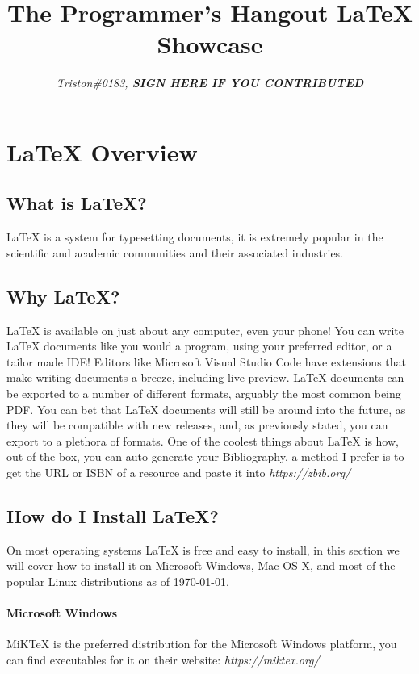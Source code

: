 \documentclass[]{report}
\title{The Programmer's Hangout \LaTeX{} Showcase}
\author{\textit{Triston\#0183, \textbf{SIGN HERE IF YOU CONTRIBUTED}}}
\begin{document}
\maketitle

\tableofcontents
\chapter{\LaTeX{} Overview}
\section{What is \LaTeX{}?}
	\LaTeX{} is a system for typesetting documents, it is extremely popular in the scientific and academic communities and their associated industries.
\section{Why \LaTeX{}?} 
	\LaTeX{} is available on just about any computer, even your phone!
	You can write \LaTeX{} documents like you would a program, using your preferred editor, or a tailor made IDE!
	Editors like Microsoft\texttrademark{} Visual Studio Code have extensions that make writing documents a breeze, including live preview.
	\LaTeX{} documents can be exported to a number of different formats, arguably the most common being PDF.
	You can bet that \LaTeX{} documents will still be around into the future, as they will be compatible with new releases, and, as previously stated, you can export to a plethora of formats.
	One of the coolest things about \LaTeX{} is how, out of the box, you can auto-generate your Bibliography, a method I prefer is to get the URL or ISBN of a resource and paste it into \textit{https://zbib.org/}
\section{How do I Install \LaTeX{}?}
	On most operating systems \LaTeX{} is free and easy to install, in this section we will cover how to install it on Microsoft\texttrademark{} Windows, Mac OS X, and most of the popular Linux distributions as of \today{}.
	\subsubsection{Microsoft\texttrademark{} Windows}
	    MiKTeX is the preferred distribution for the Microsoft\texttrademark{} Windows platform, you can find executables for it on their website: \textit{https://miktex.org/}
\end{document}

